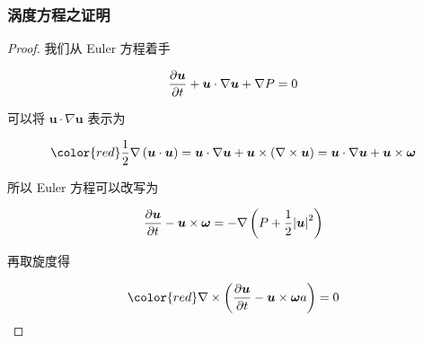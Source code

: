 \documentclass[aspectratio=2516]{beamer}
\begin{document}
\begin{frame}
\frametitle{ \kaishu 涡度方程之证明}

\kaishu

\tiny 

\begin{proof}
	
	\kaishu 
	
	\tiny 
	
	我们从 Euler 方程着手
	
	\begin{equation}
	\frac{{\partial \boldsymbol{u}}}{{\partial t}} + \boldsymbol{u} \cdot \nabla \boldsymbol{u} + \nabla P = 0
	\notag 
	\end{equation}
	
	可以将 $ \boldsymbol{u} \cdot  \nabla \boldsymbol{u} $ 表示为
	
	\begin{equation}
	\color{red}
	\frac{1}{2}\nabla \left( {\boldsymbol{u} \cdot \boldsymbol{u}} \right) = \boldsymbol{u} \cdot \nabla \boldsymbol{u} + \boldsymbol{u} \times \left( {\nabla  \times \boldsymbol{u}} \right) = \boldsymbol{u} \cdot \nabla \boldsymbol{u} + \boldsymbol{u} \times \boldsymbol{\omega} 
	\notag 
	\end{equation}
	
	所以 Euler 方程可以改写为
	
	\begin{equation}
	\frac{{\partial \boldsymbol{u}}}{{\partial t}} - \boldsymbol{u} \times \boldsymbol{\omega}  =  - \nabla \left( {P + \frac{1}{2}{{\left| \boldsymbol{u} \right|}^2}} \right)
	\notag 
	\end{equation}
	
	再取旋度得
	
	\begin{equation}
	\color{red}
	\nabla  \times \left( {\frac{{\partial \boldsymbol{u}}}{{\partial t}} - \boldsymbol{u} \times \boldsymbol{\omega}a } \right) = 0
	\notag 
	\end{equation}
	
\end{proof}

\end{frame}


\end{document}
